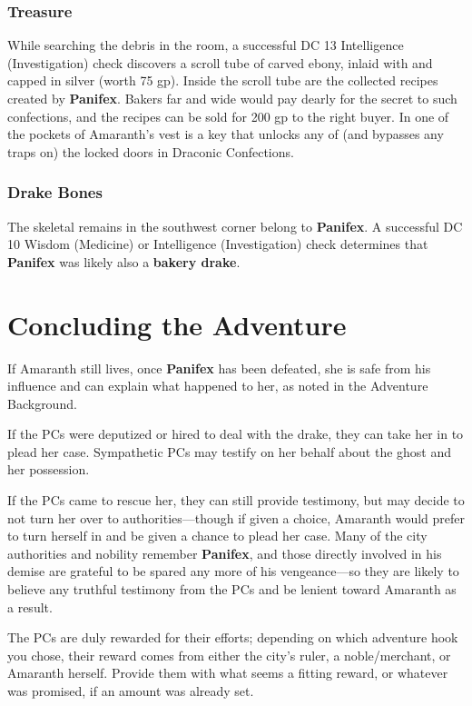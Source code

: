 \documentclass[10pt,a4paper,twoside,bg=print,twocolumn,openany,nodeprecatedcode]{dndbook}
\begin{document}
\subsubsection{Treasure}
While searching the debris in the room, a successful DC 13 Intelligence (Investigation) check discovers a scroll tube of carved ebony, inlaid with and capped in silver (worth 75 gp). Inside the scroll tube are the collected recipes created by \textbf{Panifex}. Bakers far and wide would pay dearly for the secret to such confections, and the recipes can be sold for 200 gp to the right buyer. In one of the pockets of Amaranth's vest is a key that unlocks any of (and bypasses any traps on) the locked doors in Draconic Confections.

\subsubsection{Drake Bones}
The skeletal remains in the southwest corner belong to \textbf{Panifex}. A successful DC 10 Wisdom (Medicine) or Intelligence (Investigation) check determines that \textbf{Panifex} was likely also a \textbf{bakery drake}.

\section{Concluding the Adventure}
If Amaranth still lives, once \textbf{Panifex} has been defeated, she is safe from his influence and can explain what happened to her, as noted in the Adventure Background.

If the PCs were deputized or hired to deal with the drake, they can take her in to plead her case. Sympathetic PCs may testify on her behalf about the ghost and her possession.

If the PCs came to rescue her, they can still provide testimony, but may decide to not turn her over to authorities—though if given a choice, Amaranth would prefer to turn herself in and be given a chance to plead her case. Many of the city authorities and nobility remember \textbf{Panifex}, and those directly involved in his demise are grateful to be spared any more of his vengeance—so they are likely to believe any truthful testimony from the PCs and be lenient toward Amaranth as a result.

The PCs are duly rewarded for their efforts; depending on which adventure hook you chose, their reward comes from either the city's ruler, a noble/merchant, or Amaranth herself. Provide them with what seems a fitting reward, or whatever was promised, if an amount was already set.
\end{document}
